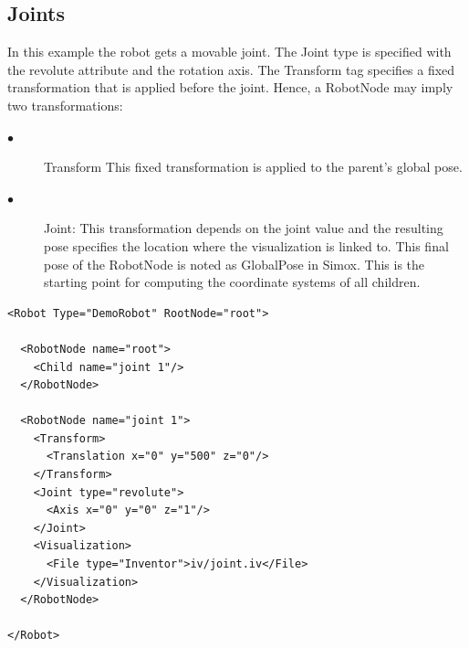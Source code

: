 \documentclass{book}
\begin{document}
\subsection{Joints}
\par
In this example the robot gets a movable joint. The Joint type is specified with the revolute attribute and the rotation axis. The Transform tag specifies a fixed transformation that is applied before the joint. Hence, a RobotNode may imply two transformations:
\begin{description}
   \item[$\bullet$] Transform This fixed transformation is applied to the parent's global pose.
 \item[$\bullet$]Joint: This transformation depends on the joint value and the resulting pose specifies the location where the visualization is linked to. This final pose of the RobotNode is noted as GlobalPose in Simox. This is the starting point for computing the coordinate systems of all children. 
\end{description}
\par
\begin{lstlisting}
<Robot Type="DemoRobot" RootNode="root">

  <RobotNode name="root">
    <Child name="joint 1"/>
  </RobotNode>

  <RobotNode name="joint 1">
    <Transform>
      <Translation x="0" y="500" z="0"/>
    </Transform>
    <Joint type="revolute">
      <Axis x="0" y="0" z="1"/>
    </Joint>
    <Visualization>
      <File type="Inventor">iv/joint.iv</File>
    </Visualization>
  </RobotNode>

</Robot>
\end{lstlisting}
\end{document}
